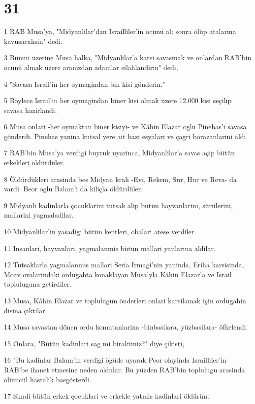 \chapter{31}

\par 1 RAB Musa'ya, "Midyanlilar'dan Israilliler'in öcünü al; sonra ölüp atalarina kavusacaksin" dedi.
\par 3 Bunun üzerine Musa halka, "Midyanlilar'a karsi savasmak ve onlardan RAB'bin öcünü almak üzere aranizdan adamlar silahlandirin" dedi,
\par 4 "Savasa Israil'in her oymagindan bin kisi gönderin."
\par 5 Böylece Israil'in her oymagindan biner kisi olmak üzere 12.000 kisi seçilip savasa hazirlandi.
\par 6 Musa onlari -her oymaktan biner kisiyi- ve Kâhin Elazar oglu Pinehas'i savasa gönderdi. Pinehas yanina kutsal yere ait bazi esyalari ve çagri borazanlarini aldi.
\par 7 RAB'bin Musa'ya verdigi buyruk uyarinca, Midyanlilar'a savas açip bütün erkekleri öldürdüler.
\par 8 Öldürdükleri arasinda bes Midyan krali -Evi, Rekem, Sur, Hur ve Reva- da vardi. Beor oglu Balam'i da kiliçla öldürdüler.
\par 9 Midyanli kadinlarla çocuklarini tutsak alip bütün hayvanlarini, sürülerini, mallarini yagmaladilar.
\par 10 Midyanlilar'in yasadigi bütün kentleri, obalari atese verdiler.
\par 11 Insanlari, hayvanlari, yagmalanmis bütün mallari yanlarina aldilar.
\par 12 Tutsaklarla yagmalanmis mallari Seria Irmagi'nin yaninda, Eriha karsisinda, Moav ovalarindaki ordugahta konaklayan Musa'yla Kâhin Elazar'a ve Israil topluluguna getirdiler.
\par 13 Musa, Kâhin Elazar ve toplulugun önderleri onlari karsilamak için ordugahin disina çiktilar.
\par 14 Musa savastan dönen ordu komutanlarina -binbasilara, yüzbasilara- öfkelendi.
\par 15 Onlara, "Bütün kadinlari sag mi biraktiniz?" diye çikisti,
\par 16 "Bu kadinlar Balam'in verdigi ögüde uyarak Peor olayinda Israilliler'in RAB'be ihanet etmesine neden oldular. Bu yüzden RAB'bin toplulugu arasinda ölümcül hastalik basgösterdi.
\par 17 Simdi bütün erkek çocuklari ve erkekle yatmis kadinlari öldürün.
